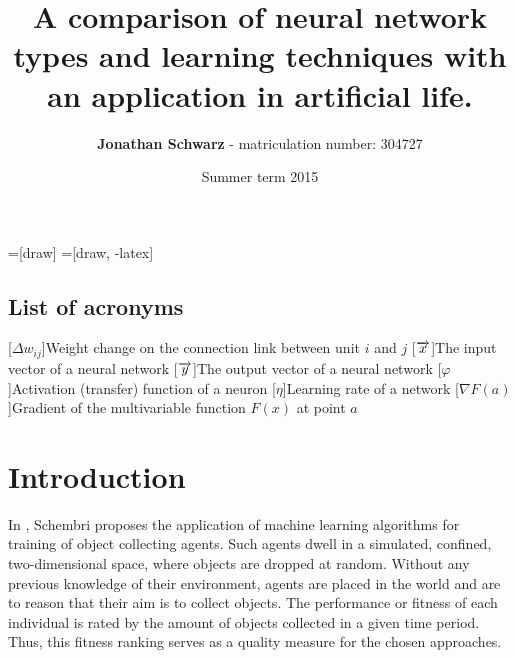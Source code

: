 \documentclass[10pt,a4paper,DIV=11]{scrreprt}
\title
{
     A comparison of neural network types and learning techniques with an application in artificial life.
}
\author
{
    \textbf{Jonathan Schwarz} - matriculation number: 304727
}
\date
{
    Summer term 2015
}
\begin{document}
=[draw]
=[draw, -latex] 


\maketitle
\thispagestyle{empty}
\newpage
{\large\tableofcontents}
\newpage

\thispagestyle{empty}

\section*{List of acronyms}
\begin{acronym}
    [$\Delta w_{ij}$]{Weight change  on the connection link between unit $i$ and $j$}
    [$\protect \overrightarrow{x}$]{The input vector of a neural network}
    [$\protect \overrightarrow{y}$]{The output vector of a neural network}
    [$\varphi$]{Activation (transfer) function of a neuron}
    [$\eta$]{Learning rate of a network}
    [$\nabla F(a)$]{Gradient of the multivariable function $F(x)$ at point $a$}
\end{acronym}

\newpage

\chapter{Introduction}
\label{ch:intro}
In \cite{DANIEL}, Schembri proposes the application of machine learning algorithms for training of object collecting agents. 
Such agents dwell in a simulated, confined, two-dimensional space, where objects are dropped at random. Without any previous knowledge of 
their environment, agents are placed in the world and are to reason that their aim is to collect objects. The performance or fitness of each 
individual is rated by the amount of objects collected in a given time period. Thus, this fitness ranking serves as a quality measure for the 
chosen approaches.
\end{document}
